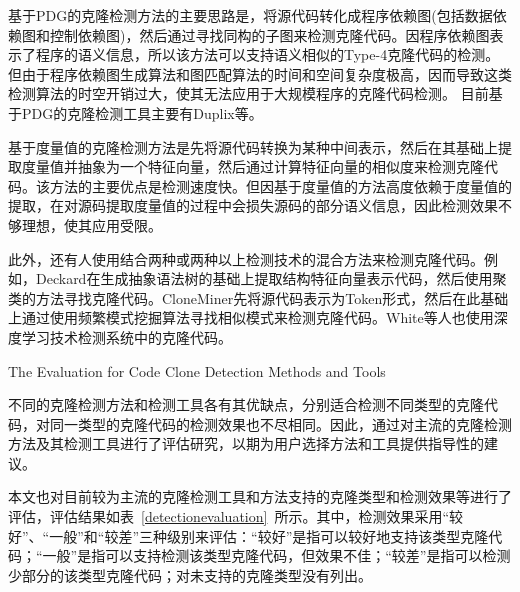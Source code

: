 基于PDG的克隆检测方法的主要思路是，将源代码转化成程序依赖图(包括数据依赖图和控制依赖图)，然后通过寻找同构的子图来检测克隆代码。因程序依赖图表示了程序的语义信息，所以该方法可以支持语义相似的Type-4克隆代码的检测。但由于程序依赖图生成算法和图匹配算法的时间和空间复杂度极高，因而导致这类检测算法的时空开销过大，使其无法应用于大规模程序的克隆代码检测。
目前基于PDG的克隆检测工具主要有Duplix\cite{krinke2001identifying}等。

基于度量值的克隆检测方法是先将源代码转换为某种中间表示，然后在其基础上提取度量值并抽象为一个特征向量，然后通过计算特征向量的相似度来检测克隆代码。该方法的主要优点是检测速度快。但因基于度量值的方法高度依赖于度量值的提取，在对源码提取度量值的过程中会损失源码的部分语义信息，因此检测效果不够理想，使其应用受限。

此外，还有人使用结合两种或两种以上检测技术的混合方法来检测克隆代码。例如，Deckard在生成抽象语法树的基础上提取结构特征向量表示代码，然后使用聚类的方法寻找克隆代码\cite{jiang2007deckard}。CloneMiner先将源代码表示为Token形式，然后在此基础上通过使用频繁模式挖掘算法寻找相似模式来检测克隆代码\cite{basit2009data}。White等人也使用深度学习技术检测系统中的克隆代码\cite{white2016deep}。


{The Evaluation for Code Clone Detection Methods and Tools}

不同的克隆检测方法和检测工具各有其优缺点，分别适合检测不同类型的克隆代码，对同一类型的克隆代码的检测效果也不尽相同。因此，通过对主流的克隆检测方法及其检测工具进行了评估研究，以期为用户选择方法和工具提供指导性的建议\cite{bellon2007comparison}\cite{rattan2013software}\cite{roy2009comparison}\cite{svajlenko2014evaluating}。%

本文也对目前较为主流的克隆检测工具和方法支持的克隆类型和检测效果等进行了评估，评估结果如表~\ref{detectionevaluation}~所示。其中，检测效果采用“较好”、“一般”和“较差”三种级别来评估\cite{rattan2013software}：“较好”是指可以较好地支持该类型克隆代码；“一般”是指可以支持检测该类型克隆代码，但效果不佳；“较差”是指可以检测少部分的该类型克隆代码；对未支持的克隆类型没有列出。

